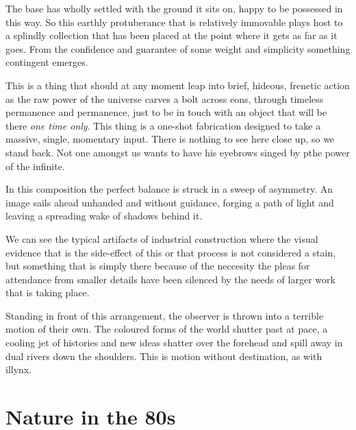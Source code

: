 \documentclass{article}
\begin{document}
The base has wholly settled with the ground it sits on, happy to be possessed
in this way. So this earthly protuberance that is relatively immovable plays
host to a splindly collection that has been placed at the point where it gets
as far as it goes. From the confidence and guarantee of some weight and
simplicity something contingent emerges.

This is a thing that should at any moment leap into brief, hideous, frenetic
action as the raw power of the universe carves a bolt across eons, through
timeless permanence and permanence, just to be in touch with an object that
will be there \emph{one time only}.  This thing is a one-shot fabrication
designed to take a massive, single, momentary input.  There is nothing to see
here close up, so we stand back. Not one amongst us wants to have his eyebrows
singed by pthe power of the infinite.

In this composition the perfect balance is struck in a sweep of asymmetry. An
image sails ahead unhanded and without guidance, forging a path of light and
leaving a spreading wake of shadows behind it.

We can see the typical artifacts of industrial construction where the visual
evidence that is the side-effect of this or that process is not considered a
stain, but something that is simply there because of the neccesity the pleas
for attendance from smaller details have been silenced by the needs of larger
work that is taking place.

Standing in front of this arrangement, the observer is thrown into a terrible
motion of their own. The coloured forms of the world shutter past at pace,
a cooling jet of histories and new ideas shatter over the forehead and spill
away in dual rivers down the shoulders. This is motion without destination, as
with illynx.

\chapter{Nature in the 80s}
\end{document}
